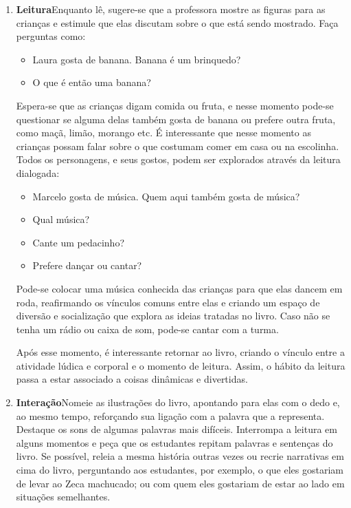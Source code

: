\documentclass[11pt]{extarticle}
\begin{document}
\begin{enumerate}


\item \textbf{Leitura}\quad Enquanto lê, sugere-se que a professora mostre as figuras para as crianças e estimule que elas discutam sobre o que está sendo mostrado.
Faça perguntas como:

\begin{itemize}
\item Laura gosta de banana. Banana é um brinquedo?
\item O que é então uma banana?
\end{itemize}


Espera-se que as crianças digam comida ou fruta, e nesse momento pode-se questionar se alguma delas também gosta de banana ou prefere outra fruta, como maçã, limão, morango etc. É interessante que nesse momento as crianças possam falar sobre o que costumam comer em casa ou na escolinha.
Todos os personagens, e seus gostos, podem ser explorados através da leitura dialogada:

\begin{itemize}
\item Marcelo gosta de música. Quem aqui também gosta de música?
\item Qual música?
\item Cante um pedacinho?
\item Prefere dançar ou cantar?
\end{itemize}

Pode-se colocar uma música conhecida das crianças para que elas dancem em roda, reafirmando os vínculos comuns entre elas e criando um espaço de diversão e socialização que explora as ideias tratadas no livro. Caso não se tenha um rádio ou caixa de som, pode-se cantar com a turma.


Após esse momento, é interessante retornar ao livro, criando o vínculo entre a atividade lúdica e corporal e o momento de leitura. Assim, o hábito da leitura passa a estar associado a coisas dinâmicas e divertidas.


\item \textbf{Interação}\quad Nomeie as ilustrações 
do livro, apontando para elas com o dedo e, ao mesmo tempo, reforçando sua ligação com a palavra que a representa. Destaque os sons de algumas 
palavras mais difíceis. Interrompa a leitura em alguns momentos e peça que 
os estudantes repitam palavras e sentenças do livro. Se possível, 
releia a mesma história outras vezes ou recrie narrativas em cima do livro, perguntando aos estudantes, por exemplo, o que eles gostariam de levar ao Zeca machucado; ou com quem eles gostariam de estar ao lado em situações semelhantes.


\end{enumerate}
\end{document}
